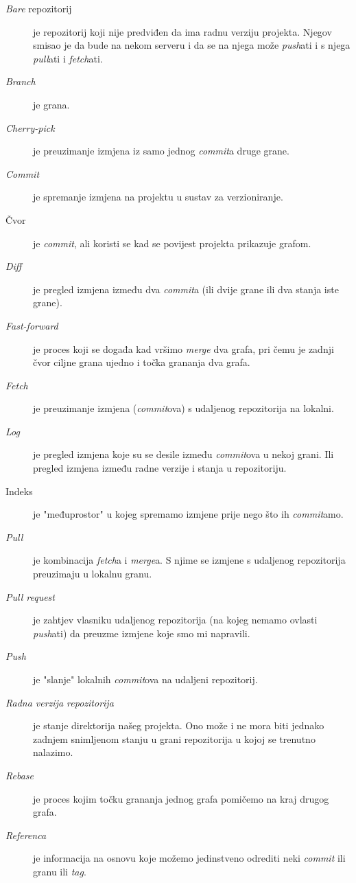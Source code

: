 \begin{description}
    \item[\emph{Bare} repozitorij] je repozitorij koji nije predviđen da ima radnu verziju projekta. Njegov smisao je da bude na nekom serveru i da se na njega može \emph{push}ati i s njega \emph{pull}ati i \emph{fetch}ati.
    \item[\emph{Branch}] je grana.
    \item[\emph{Cherry-pick}] je preuzimanje izmjena iz samo jednog \emph{commit}a druge grane.
    \item[\emph{Commit}] je spremanje izmjena na projektu u sustav za verzioniranje.
    \item[Čvor] je \emph{commit}, ali koristi se kad se povijest projekta prikazuje grafom.
    \item[\emph{Diff}] je pregled izmjena između dva \emph{commit}a (ili dvije grane ili dva stanja iste grane).
    \item[\emph{Fast-forward}] je proces koji se događa kad vršimo \emph{merge} dva grafa, pri čemu je zadnji čvor ciljne grana ujedno i točka grananja dva grafa.
    \item[\emph{Fetch}] je preuzimanje izmjena (\emph{commit}ova) s udaljenog repozitorija na lokalni.
    \item[\emph{Log}] je pregled izmjena koje su se desile između \emph{commit}ova u nekoj grani. Ili pregled izmjena između radne verzije i stanja u repozitoriju.
    \item[Indeks] je "međuprostor" u kojeg spremamo izmjene prije nego što ih \emph{commit}amo.
    \item[\emph{Pull}] je kombinacija \emph{fetch}a i \emph{merge}a. S njime se izmjene s udaljenog repozitorija preuzimaju u lokalnu granu.
    \item[\emph{Pull request}] je zahtjev vlasniku udaljenog repozitorija (na kojeg nemamo ovlasti \emph{push}ati) da preuzme izmjene koje smo mi napravili.
    \item[\emph{Push}] je "slanje" lokalnih \emph{commit}ova na udaljeni repozitorij.
    \item[\emph{Radna verzija repozitorija}] je stanje direktorija našeg projekta. Ono može i ne mora biti jednako zadnjem snimljenom stanju u grani repozitorija u kojoj se trenutno nalazimo.
    \item[\emph{Rebase}] je proces kojim točku grananja jednog grafa pomičemo na kraj drugog grafa.
    \item[\emph{Referenca}] je informacija na osnovu koje možemo jedinstveno odrediti neki \emph{commit} ili granu ili \emph{tag}.

\end{description}
